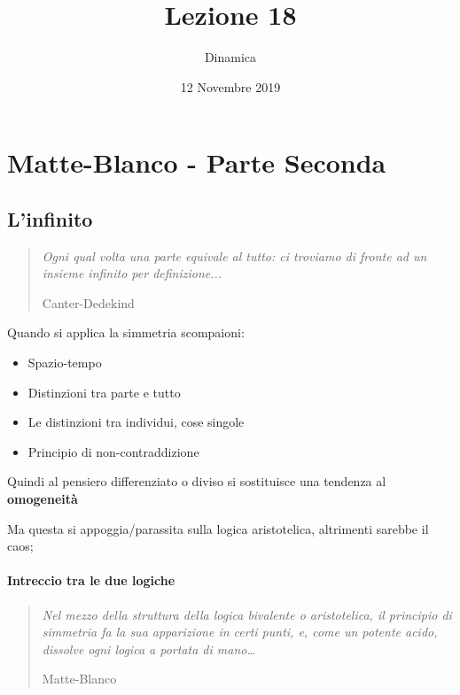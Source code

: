 \documentclass[12pt, a4paper]{article}
\date{12 Novembre 2019}
\title{Lezione 18}
\author{Dinamica}
\begin{document}
\maketitle

\section{Matte-Blanco - Parte Seconda}

\subsection{L'infinito}

\begin{quote}
    \emph{Ogni qual volta una parte equivale al tutto: ci troviamo di fronte ad un insieme infinito per definizione...}
    \begin{flushright}
        Canter-Dedekind
    \end{flushright}
\end{quote}

Quando si applica la simmetria scompaioni:

\begin{itemize}
    \item Spazio-tempo
    \item Distinzioni tra parte e tutto
    \item Le distinzioni tra individui, cose singole
    \item Principio di non-contraddizione
\end{itemize}
Quindi al pensiero differenziato o diviso si sostituisce una tendenza al \textbf{omo\-ge\-neità}

Ma questa si appoggia/parassita sulla logica aristotelica, altrimenti sa\-reb\-be il caos;

\paragraph{Intreccio tra le due logiche}  
\begin{quote}
    \emph{Nel mezzo della struttura della logica bivalente o aristotelica, il principio di simmetria fa la sua apparizione in certi punti, e, come un potente acido, dissolve ogni logica a portata di mano\ldots}
    \begin{flushright}
        Matte-Blanco
    \end{flushright}
\end{quote}
\end{document}
